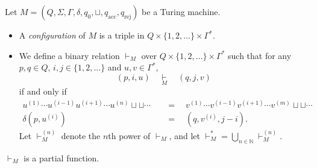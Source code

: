 \begin{definition}
  Let $M = (Q, \Sigma, \Gamma, \delta, q_0, \sqcup, q_\text{acc},
  q_\text{rej})$ be a Turing machine.
  \begin{itemize}
    \item A \emph{configuration} of $M$ is a triple in
    $Q \times \{1, 2, \dots\} \times \Gamma^*$.
    \item We define a binary relation $\vdash_M$ over $Q \times \{1, 2, \dots\}
    \times \Gamma^*$ such that for any $p, q \in Q$, $i, j \in \{1, 2, \dots
    \}$ and $u, v \in \Gamma^*$,
    \begin{equation*}
      (p, i, u)
      \quad \mathop\vdash\limits_{M} \quad
      (q, j, v)
    \end{equation*}
    if and only if
    \begin{align*}
      u^{(1)} \cdots u^{(i-1)}u^{(i+1)} \cdots u^{(n)} \sqcup \sqcup \cdots
      \quad &= \quad
      v^{(1)} \cdots v^{(i-1)}v^{(i+1)} \cdots v^{(m)} \sqcup \sqcup \cdots \\
      \delta(p, u^{(i)}) \quad &= \quad (q, v^{(i)}, j - i).
    \end{align*}
    Let $\vdash_M^{(n)}$ denote the $n$th power of $\vdash_M$, and let
    $\mathord{\vdash_M^*} = \bigcup_{n \in \mathbb{N}} \vdash_M^{(n)}$.
  \end{itemize}
\end{definition}
\begin{remark}
  $\vdash_M$ is a partial function.
\end{remark}

